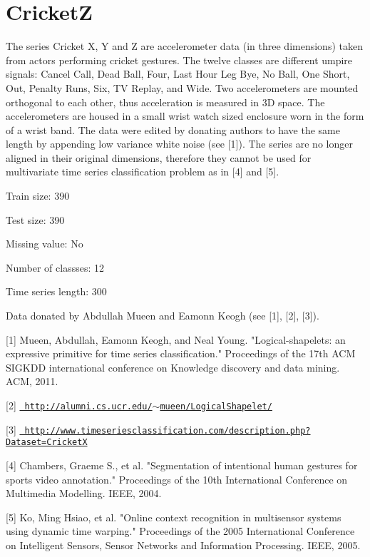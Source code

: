 \chapter{CricketZ}
\hypertarget{md_external_2data_2UCRArchive__2018_2CricketZ_2README}{}\label{md_external_2data_2UCRArchive__2018_2CricketZ_2README}
\label{md_external_2data_2UCRArchive__2018_2CricketZ_2README_autotoc_md39}%
%
 The series Cricket X, Y and Z are accelerometer data (in three dimensions) taken from actors performing cricket gestures. The twelve classes are different umpire signals\+: Cancel Call, Dead Ball, Four, Last Hour Leg Bye, No Ball, One Short, Out, Penalty Runs, Six, TV Replay, and Wide. Two accelerometers are mounted orthogonal to each other, thus acceleration is measured in 3D space. The accelerometers are housed in a small wrist watch sized enclosure worn in the form of a wrist band. The data were edited by donating authors to have the same length by appending low variance white noise (see \mbox{[}1\mbox{]}). The series are no longer aligned in their original dimensions, therefore they cannot be used for multivariate time series classification problem as in \mbox{[}4\mbox{]} and \mbox{[}5\mbox{]}.

Train size\+: 390

Test size\+: 390

Missing value\+: No

Number of classses\+: 12

Time series length\+: 300

Data donated by Abdullah Mueen and Eamonn Keogh (see \mbox{[}1\mbox{]}, \mbox{[}2\mbox{]}, \mbox{[}3\mbox{]}).

\mbox{[}1\mbox{]} Mueen, Abdullah, Eamonn Keogh, and Neal Young. "{}\+Logical-\/shapelets\+: an expressive primitive for time series classification."{} Proceedings of the 17th ACM SIGKDD international conference on Knowledge discovery and data mining. ACM, 2011.

\mbox{[}2\mbox{]} \href{http://alumni.cs.ucr.edu/~mueen/LogicalShapelet/}{\texttt{ http\+://alumni.\+cs.\+ucr.\+edu/\texorpdfstring{$\sim$}{\string~}mueen/\+Logical\+Shapelet/}}

\mbox{[}3\mbox{]} \href{http://www.timeseriesclassification.com/description.php?Dataset=CricketX}{\texttt{ http\+://www.\+timeseriesclassification.\+com/description.\+php?\+Dataset=\+CricketX}}

\mbox{[}4\mbox{]} Chambers, Graeme S., et al. "{}\+Segmentation of intentional human gestures for sports video annotation."{} Proceedings of the 10th International Conference on Multimedia Modelling. IEEE, 2004.

\mbox{[}5\mbox{]} Ko, Ming Hsiao, et al. "{}\+Online context recognition in multisensor systems using dynamic time warping."{} Proceedings of the 2005 International Conference on Intelligent Sensors, Sensor Networks and Information Processing. IEEE, 2005. 
